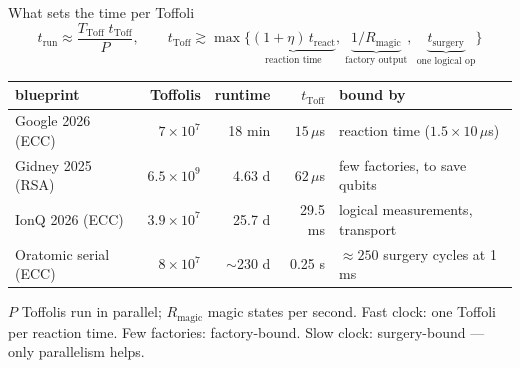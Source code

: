 \documentclass[aspectratio=169,11pt]{beamer}
\begin{document}
\begin{frame}{What sets the time per Toffoli}
  \[
    t_{\mathrm{run}}\approx\frac{T_{\mathrm{Toff}}\;t_{\mathrm{Toff}}}{P},\qquad
    t_{\mathrm{Toff}}\gtrsim\max\{\underbrace{(1+\eta)\,t_{\mathrm{react}}}_{\text{reaction time}},\ \underbrace{1/R_{\mathrm{magic}}}_{\text{factory output}},\ \underbrace{t_{\mathrm{surgery}}}_{\text{one logical op}}\}
  \]
  \centering\small
  \renewcommand{\arraystretch}{1.2}
  \begin{tabular}{@{}lrrrl@{}}
    \toprule
    blueprint & Toffolis & runtime & $t_{\mathrm{Toff}}$ & bound by \\
    \midrule
    Google 2026 (ECC) & $7\times10^7$ & 18 min & $15\,\mu$s & reaction time ($1.5\times10\,\mu$s) \\
    Gidney 2025 (RSA) & $6.5\times10^9$ & 4.63 d & $62\,\mu$s & few factories, to save qubits \\
    IonQ 2026 (ECC) & $3.9\times10^7$ & 25.7 d & 29.5 ms & logical measurements, transport \\
    Oratomic serial (ECC) & $8\times10^7$ & $\sim$230 d & 0.25 s & $\approx250$ surgery cycles at 1 ms \\
    \bottomrule
  \end{tabular}
  \begin{takeaway}$P$ Toffolis run in parallel; $R_{\mathrm{magic}}$ magic states per second. Fast clock: one Toffoli per reaction time. Few factories: factory-bound. Slow clock: surgery-bound --- only parallelism helps.\end{takeaway}
\end{frame}
\end{document}

